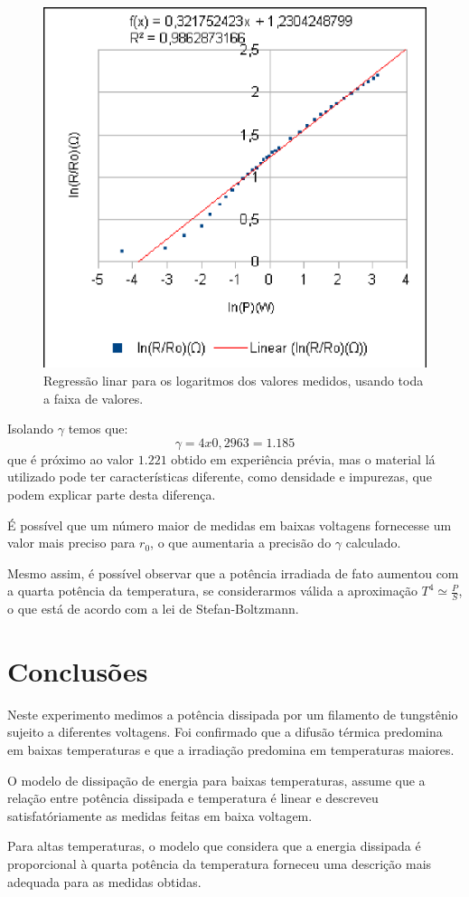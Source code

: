 \documentclass[brazilian,12pt,a4paper,final]{article}
\begin{document}
\begin{figure}[htbp!]
  \caption{Regressão linar para os logaritmos dos valores medidos, usando toda a faixa de valores.}
  \label{figfimgr}
  \centering
    \includegraphics{fimgr.eps}
\end{figure}

Isolando $\gamma$ temos que:
$$\gamma=4x0,2963=1.185$$
que é próximo ao valor $1.221$ obtido em experiência prévia,
mas o material lá utilizado pode ter características diferente,
como densidade e impurezas, que podem explicar parte desta diferença.

É possível que um número maior de medidas em baixas voltagens fornecesse
um valor mais preciso para $r_0$, o que aumentaria a precisão do $\gamma$
calculado.

Mesmo assim, é possível observar que a potência irradiada de fato aumentou
com a quarta potência da temperatura, se considerarmos válida a aproximação
$T^4\simeq \frac{P}{S}$, o que está de acordo com a lei de Stefan-Boltzmann.

\section{Conclusões}
Neste experimento medimos a potência dissipada por um filamento de tungstênio
sujeito a diferentes voltagens. Foi confirmado que a difusão térmica predomina
em baixas temperaturas e que a irradiação predomina em temperaturas maiores.

O modelo de dissipação de energia para baixas temperaturas, 
assume que a relação entre potência dissipada e temperatura é linear
e descreveu satisfatóriamente as medidas feitas em baixa voltagem.

Para altas temperaturas, 
o modelo que considera que 
a energia dissipada é proporcional à quarta potência da temperatura 
forneceu uma descrição mais adequada para as medidas obtidas.




\end{document}

